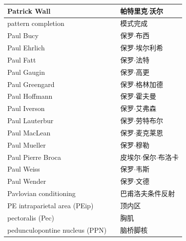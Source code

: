 \begin{longtable}{lll}
	\midrule
	Patrick Wall     && 帕特里克$\cdot$沃尔   \\
	
	\midrule
	pattern completion     && 模式完成   \\
	
	\midrule
	Paul Bucy     && 保罗$\cdot$布西  \\
	
	\midrule
	Paul Ehrlich     && 保罗$\cdot$埃尔利希  \\
	
	\midrule
	Paul Fatt     && 保罗$\cdot$法特  \\
	
	\midrule
	Paul Gaugin     && 保罗$\cdot$高更  \\
	
	\midrule
	Paul Greengard     && 保罗$\cdot$格林加德  \\
	
	\midrule
	Paul Hoffmann     && 保罗$\cdot$霍夫曼  \\
	
	\midrule
	Paul Iverson     && 保罗$\cdot$艾弗森  \\
	
	\midrule
	Paul Lauterbur     && 保罗$\cdot$劳特布尔  \\
	
	\midrule
	Paul MacLean     && 保罗$\cdot$麦克莱恩  \\
	
	\midrule
	Paul Mueller     && 保罗$\cdot$穆勒  \\
	
	\midrule
	Paul Pierre Broca     && 皮埃尔$\cdot$保尔$\cdot$布洛卡  \\
	
	\midrule
	Paul Weiss     && 保罗$\cdot$韦斯  \\
	
	\midrule
	Paul Wender     && 保罗$\cdot$文德  \\
	
	\midrule
	Pavlovian conditioning     && 巴甫洛夫条件反射  \\
	
	\midrule
	PE intraparietal area (PEip)   && 顶内区   \\
	
	\midrule
	pectoralis (Pec)    && 胸肌   \\
	
	\midrule
	pedunculopontine nucleus (PPN)     && 脑桥脚核   \\
	

\end{longtable}
